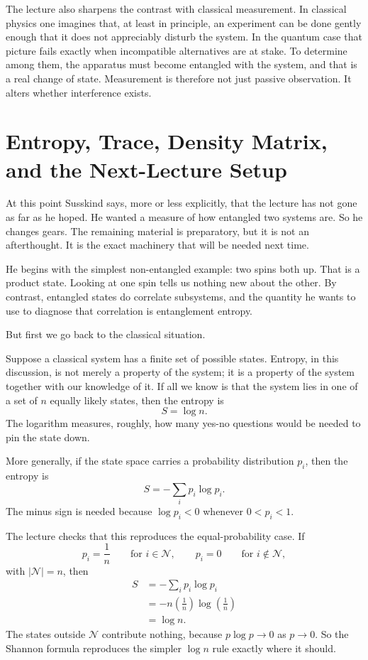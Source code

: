 The lecture also sharpens the contrast with classical measurement. In classical physics one imagines that, at least in principle, an experiment can be done gently enough that it does not appreciably disturb the system. In the quantum case that picture fails exactly when incompatible alternatives are at stake. To determine among them, the apparatus must become entangled with the system, and that is a real change of state. Measurement is therefore not just passive observation. It alters whether interference exists.

\section{Entropy, Trace, Density Matrix, and the Next-Lecture Setup}

At this point Susskind says, more or less explicitly, that the lecture has not gone as far as he hoped. He wanted a measure of how entangled two systems are. So he changes gears. The remaining material is preparatory, but it is not an afterthought. It is the exact machinery that will be needed next time.

He begins with the simplest non-entangled example: two spins both up. That is a product state. Looking at one spin tells us nothing new about the other. By contrast, entangled states do correlate subsystems, and the quantity he wants to use to diagnose that correlation is entanglement entropy.

But first we go back to the classical situation.

Suppose a classical system has a finite set of possible states. Entropy, in this discussion, is not merely a property of the system; it is a property of the system together with our knowledge of it. If all we know is that the system lies in one of a set of \(n\) equally likely states, then the entropy is
\begin{equation}
S=\log n .
\end{equation}
The logarithm measures, roughly, how many yes-no questions would be needed to pin the state down.

More generally, if the state space carries a probability distribution \(p_i\), then the entropy is
\begin{equation}
S=-\sum_i p_i\log p_i .
\end{equation}
The minus sign is needed because \(\log p_i<0\) whenever \(0<p_i<1\).

The lecture checks that this reproduces the equal-probability case. If
\begin{equation}
p_i=\frac{1}{n}
\qquad \text{for } i\in \mathcal N,
\qquad
p_i=0
\qquad \text{for } i\notin \mathcal N ,
\end{equation}
with \(|\mathcal N|=n\), then
\begin{align}
S
&=
-\sum_i p_i\log p_i \\
&=
-n\left(\frac{1}{n}\right)\log\left(\frac{1}{n}\right) \\
&=
\log n .
\end{align}
The states outside \(\mathcal N\) contribute nothing, because \(p\log p\to 0\) as \(p\to 0\). So the Shannon formula reproduces the simpler \(\log n\) rule exactly where it should.

